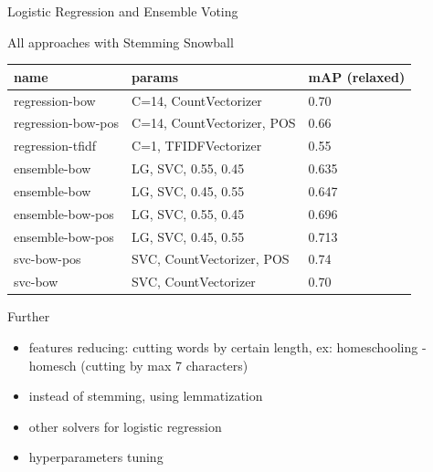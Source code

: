 \documentclass[english,handout]{mlutalk}
\begin{document}
\begin{frame}[allowframebreaks]{Logistic Regression and Ensemble Voting}

\begin{block}{All approaches with Stemming Snowball}
  \begin{tabular}{lll}
    \toprule
      name & params & mAP (relaxed) \\
    \midrule
      regression-bow & C=14, CountVectorizer & 0.70 \\
      regression-bow-pos & C=14, CountVectorizer, POS & 0.66\\
      regression-tfidf & C=1, TFIDFVectorizer & 0.55 \\
      ensemble-bow & LG, SVC, 0.55, 0.45 & 0.635 \\
      ensemble-bow & LG, SVC, 0.45, 0.55 & 0.647 \\
      ensemble-bow-pos & LG, SVC, 0.55, 0.45 & 0.696 \\
      ensemble-bow-pos & LG, SVC, 0.45, 0.55 & 0.713 \\
      svc-bow-pos & SVC, CountVectorizer, POS &   0.74 \\
      svc-bow & SVC, CountVectorizer & 0.70\\
    \bottomrule
  \end{tabular}
\end{block}
\framebreak
\begin{block}{Further}
\begin{itemize}
    \item features reducing: cutting words by certain length, ex: homeschooling - homesch (cutting by max 7 characters)
    \item instead of stemming, using lemmatization
    \item other solvers for logistic regression
    \item hyperparameters tuning
\end{itemize}
\end{block}
\end{frame}



\appendix
\section{\appendixname}

\bibliographyframe
\end{document}
